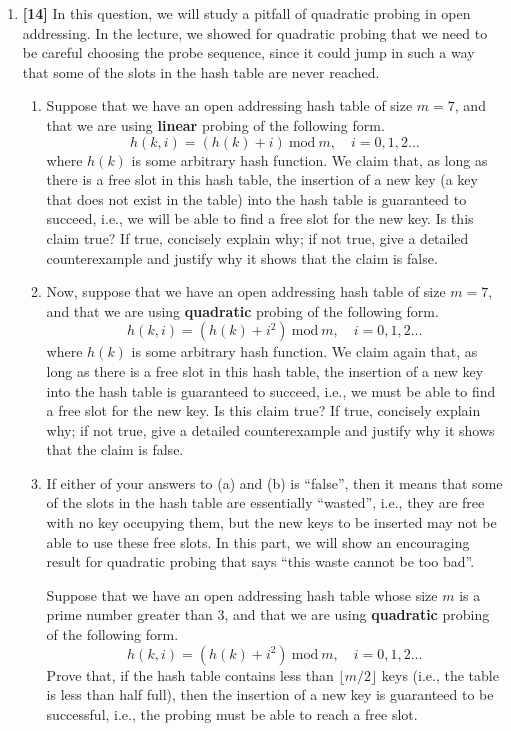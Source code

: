 \documentclass{assignment-263}
\begin{document}
\think

\begin{enumerate}
	\item \textbf{[14]} In this question, we will study a pitfall of
		quadratic probing in open addressing. In the lecture, we showed
	 for quadratic probing that we need to be careful choosing the
		probe sequence, since it could jump in such a way that some of the
		slots in the hash table are never reached.
		\begin{enumerate}
			\item Suppose that we have an open addressing hash table of size
				$m=7$, and that we are using \textbf{linear} probing of the
				following form.
				\[
					h(k, i) = (h(k) + i)~\text{mod}~m,\quad i = 0, 1, 2\dots
				\]
				where $h(k)$ is some arbitrary hash function. We claim that,
				as long as there is a free slot in this hash table, the
				insertion of a new key (a key that does not exist in the
				table) into the hash table is guaranteed to succeed, i.e.,
				we will be able to find a free slot for the new key. Is this
				claim true? If true, concisely explain why; if not true,
				give a detailed counterexample and justify why it shows that
				the claim is false.

			\item Now, suppose that we have an open addressing hash table
				of size $m=7$, and that we are using \textbf{quadratic}
				probing of the following form.
				\[
					h(k, i) = (h(k) + i^2)~\text{mod}~m,\quad i = 0, 1, 2\dots
				\]
				where $h(k)$ is some arbitrary hash function. We claim again
				that, as long as there is a free slot in this hash table,
				the insertion of a new key into the hash table is guaranteed
				to succeed, i.e., we must be able to find a free slot for
				the new key. Is this claim true? If true, concisely explain
				why; if not true, give a detailed counterexample and justify
				why it shows that the claim is false.

			\item If either of your answers to (a) and (b) is ``false'',
				then it means that some of the slots in the hash table are
				essentially ``wasted'', i.e., they are free with no key
				occupying them, but the new keys to be inserted may not be
				able to use these free slots. In this part, we will show
				an encouraging result for quadratic probing that says ``this
				waste cannot be too bad''.

				Suppose that we have an open addressing hash table whose
				size $m$ is a prime number greater than 3, and that we are
				using \textbf{quadratic} probing of the following form.
				\[
					h(k, i) = (h(k) + i^2)~\text{mod}~m,\quad i = 0, 1, 2\dots
				\]
				Prove that, if the hash table contains less than $\lfloor
				m/2 \rfloor$ keys (i.e., the table is less than half full),
				then the insertion of a new key is guaranteed to be
				successful, i.e., the probing must be able to reach a free
				slot.


\end{enumerate}
\end{enumerate}
\end{document}
